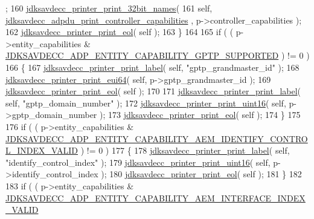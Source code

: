 \begin{DoxyCode}
      ;
160             \hyperlink{group__util_ga12c5206fd238e3e8188693746f0d8ce7}{jdksavdecc\_printer\_print\_32bit\_names}(
161                 \textcolor{keyword}{self}, \hyperlink{group__adp__print_ga338d7b70fd9a2b2177827cab7867c279}{jdksavdecc\_adpdu\_print\_controller\_capabilities}
      , p->controller\_capabilities );
162             \hyperlink{group__util_gacda56c9d3d24593a52c999682fa6e6e3}{jdksavdecc\_printer\_print\_eol}( \textcolor{keyword}{self} );
163         \}
164 
165         \textcolor{keywordflow}{if} ( ( p->entity\_capabilities & 
      \hyperlink{group__adp__entity__capability_gaf39226a31d10f4cb12894e5c4b7ac324}{JDKSAVDECC\_ADP\_ENTITY\_CAPABILITY\_GPTP\_SUPPORTED} ) != 0 )
166         \{
167             \hyperlink{group__util_gaf7818b24143b3c7502926a425a242ff5}{jdksavdecc\_printer\_print\_label}( \textcolor{keyword}{self}, \textcolor{stringliteral}{"gptp\_grandmaster\_id"} );
168             \hyperlink{group__util_gafdf65e002e889f4fc89db5d1e532eaa3}{jdksavdecc\_printer\_print\_eui64}( \textcolor{keyword}{self}, p->gptp\_grandmaster\_id );
169             \hyperlink{group__util_gacda56c9d3d24593a52c999682fa6e6e3}{jdksavdecc\_printer\_print\_eol}( \textcolor{keyword}{self} );
170 
171             \hyperlink{group__util_gaf7818b24143b3c7502926a425a242ff5}{jdksavdecc\_printer\_print\_label}( \textcolor{keyword}{self}, \textcolor{stringliteral}{"gptp\_domain\_number"} );
172             \hyperlink{group__util_ga9793e0ff8e7ed25d957282ee6b257ce2}{jdksavdecc\_printer\_print\_uint16}( \textcolor{keyword}{self}, p->gptp\_domain\_number );
173             \hyperlink{group__util_gacda56c9d3d24593a52c999682fa6e6e3}{jdksavdecc\_printer\_print\_eol}( \textcolor{keyword}{self} );
174         \}
175 
176         \textcolor{keywordflow}{if} ( ( p->entity\_capabilities & 
      \hyperlink{group__adp__entity__capability_gaa5c00396d204182da88d5010de83d19a}{JDKSAVDECC\_ADP\_ENTITY\_CAPABILITY\_AEM\_IDENTIFY\_CONTROL\_INDEX\_VALID}
       ) != 0 )
177         \{
178             \hyperlink{group__util_gaf7818b24143b3c7502926a425a242ff5}{jdksavdecc\_printer\_print\_label}( \textcolor{keyword}{self}, \textcolor{stringliteral}{"identify\_control\_index"} );
179             \hyperlink{group__util_ga9793e0ff8e7ed25d957282ee6b257ce2}{jdksavdecc\_printer\_print\_uint16}( \textcolor{keyword}{self}, p->identify\_control\_index
       );
180             \hyperlink{group__util_gacda56c9d3d24593a52c999682fa6e6e3}{jdksavdecc\_printer\_print\_eol}( \textcolor{keyword}{self} );
181         \}
182 
183         \textcolor{keywordflow}{if} ( ( p->entity\_capabilities & 
      \hyperlink{group__adp__entity__capability_ga049df3d92451cf4e015824e6c2ca641d}{JDKSAVDECC\_ADP\_ENTITY\_CAPABILITY\_AEM\_INTERFACE\_INDEX\_VALID}

\end{DoxyCode}
